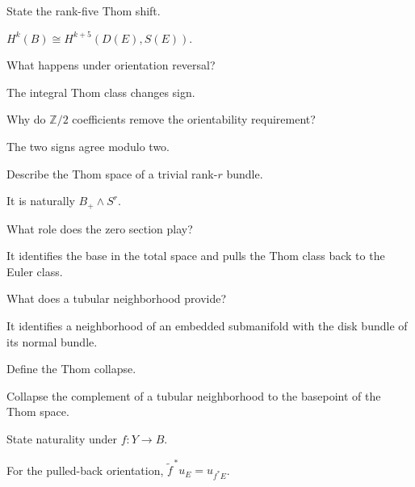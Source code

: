 \begin{problem}
State the rank-five Thom shift.
\end{problem}
\begin{solution}
$H^k(B)\cong H^{k+5}(D(E),S(E))$.
\end{solution}

\begin{problem}
What happens under orientation reversal?
\end{problem}
\begin{solution}
The integral Thom class changes sign.
\end{solution}

\begin{problem}
Why do $\mathbb Z/2$ coefficients remove the orientability requirement?
\end{problem}
\begin{solution}
The two signs agree modulo two.
\end{solution}

\begin{problem}
Describe the Thom space of a trivial rank-$r$ bundle.
\end{problem}
\begin{solution}
It is naturally $B_+\wedge S^r$.
\end{solution}

\begin{problem}
What role does the zero section play?
\end{problem}
\begin{solution}
It identifies the base in the total space and pulls the Thom class back to the Euler class.
\end{solution}

\begin{problem}
What does a tubular neighborhood provide?
\end{problem}
\begin{solution}
It identifies a neighborhood of an embedded submanifold with the disk bundle of its normal bundle.
\end{solution}

\begin{problem}
Define the Thom collapse.
\end{problem}
\begin{solution}
Collapse the complement of a tubular neighborhood to the basepoint of the Thom space.
\end{solution}

\begin{problem}
State naturality under $f:Y\to B$.
\end{problem}
\begin{solution}
For the pulled-back orientation, $\widetilde f^{\,*}u_E=u_{f^*E}$.
\end{solution}

